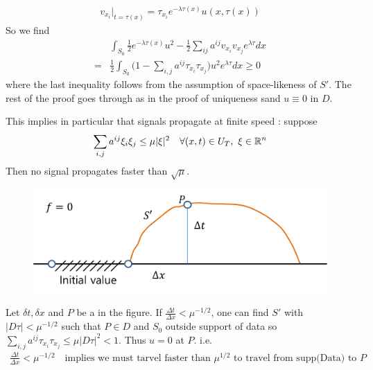 \documentclass[12pt,a4paper]{report}
\newenvironment{proof}
{\begin{changemargin}{1cm}{0.5cm} 
	}%
	{\end{changemargin}
}
\begin{document}
\begin{proof}
\begin{align*}
v_{x_i} \big|_{t= \tau(x)} = \tau_{x_i} e^{-\lambda \tau(x)} u(x, \tau(x))
\end{align*}
So we find
\begin{align*}
&\int_{S_0} \frac{1}{2} e^{-\lambda \tau(x)} u^2 - \frac{1}{2} \sum_{ij} a^{ij} v_{x_i}v_{x_j} e^{\lambda \tau} dx \\
=& \frac{1}{2} \int_{S_0} \big( 1- \sum_{i,j}a^{ij}\tau_{x_i} \tau_{x_j} \big) u^2 e^{\lambda \tau} dx \geq 0
\end{align*}
where the last inequality follows from the assumption of space-likeness of $S'$. The rest of the proof goes through as in the proof of uniqueness sand $u \equiv 0$ in $D$.

\eop
\end{proof}
\s

This implies in particular that signals propagate at finite speed : suppose
\begin{align*}
\sum_{i,j} a^{ij} \xi_i \xi_j \leq \mu |\xi|^2 \quad \forall (x,t) \in U_T, \,\, \xi \in \mathbb{R}^n
\end{align*}
Then no signal propagates faster than $\sqrt{\mu}$. 
\begin{figure}[h]
\begin{center}
	\includegraphics[scale=0.6]{11}
\end{center}
\end{figure}
Let $\delta t, \delta x$ and $P$ be a in the figure. If $\frac{\Delta t}{\Delta x} < \mu^{-1/2}$, one can find $S'$ with $|D\tau |< \mu^{-1/2}$ such that $P\in D$ and $S_0$ outside support of data so $\sum_{i,j} a^{ij} \tau_{x_i} \tau_{x_j} \leq \mu |D\tau|^2 <1$. Thus $u=0$ at $P$. i.e.
\begin{align*}
\frac{\Delta t}{\Delta x} < \mu^{-1/2} \quad \text{implies we must tarvel faster than } \mu^{1/2} \text{ to travel from supp(Data) to } P
\end{align*}
\end{document}
